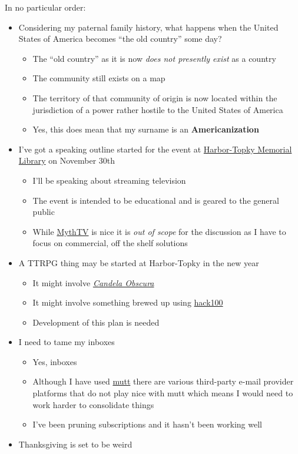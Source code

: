 In no particular order:

\begin{itemize}
\tightlist
\item
  Considering my paternal family history, what happens when the United
  States of America becomes ``the old country'' some day?

  \begin{itemize}
  \tightlist
  \item
    The ``old country'' as it is now \emph{does not presently exist} as
    a country
  \item
    The community still exists on a map
  \item
    The territory of that community of origin is now located within the
    jurisdiction of a power rather hostile to the United States of
    America
  \item
    Yes, this does mean that my surname is an \textbf{Americanization}
  \end{itemize}
\item
  I've got a speaking outline started for the event at
  \href{https://www.harbortopky.lib.oh.us}{Harbor-Topky Memorial
  Library} on November 30th

  \begin{itemize}
  \tightlist
  \item
    I'll be speaking about streaming television
  \item
    The event is intended to be educational and is geared to the general
    public
  \item
    While \href{https://www.mythtv.org}{MythTV} is nice it is \emph{out
    of scope} for the discussion as I have to focus on commercial, off
    the shelf solutions
  \end{itemize}
\item
  A TTRPG thing may be started at Harbor-Topky in the new year

  \begin{itemize}
  \tightlist
  \item
    It might involve
    \href{https://darringtonpress.com/candela/}{\emph{Candela Obscura}}
  \item
    It might involve something brewed up using
    \href{https://hack100rpg.com}{hack100}
  \item
    Development of this plan is needed
  \end{itemize}
\item
  I need to tame my inboxes

  \begin{itemize}
  \tightlist
  \item
    Yes, inboxes
  \item
    Although I have used
    \href{https://en.wikipedia.org/wiki/Mutt_(email_client)}{mutt} there
    are various third-party e-mail provider platforms that do not play
    nice with mutt which means I would need to work harder to
    consolidate things
  \item
    I've been pruning subscriptions and it hasn't been working well
  \end{itemize}
\item
  Thanksgiving is set to be weird


\end{itemize}
